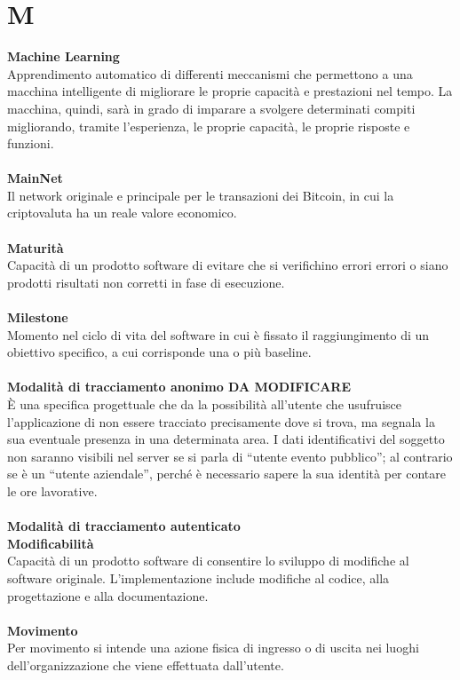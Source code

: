 \section{M}
\textbf{Machine Learning}\\
Apprendimento automatico di differenti meccanismi che permettono a una macchina intelligente di migliorare le proprie capacità e prestazioni nel tempo. La macchina, quindi, sarà in grado di imparare a svolgere determinati compiti migliorando, tramite l’esperienza, le proprie capacità, le proprie risposte e funzioni. \\ \\
\textbf{MainNet}\\
Il network originale e principale per le transazioni dei Bitcoin, in cui la criptovaluta ha un reale valore economico. \\ \\
\textbf{Maturità}\\
Capacità di un prodotto software di evitare che si verifichino errori errori o siano prodotti risultati non corretti in fase di esecuzione. \\ \\
\textbf{Milestone}\\
Momento nel ciclo di vita del software in cui è fissato il raggiungimento di un obiettivo specifico, a cui corrisponde una o più baseline.\\ \\
\textbf{Modalità di tracciamento anonimo DA MODIFICARE}\\
È una specifica progettuale che da la possibilità all’utente che usufruisce l’applicazione di non essere tracciato precisamente dove si trova, ma segnala la sua eventuale presenza in una determinata area. I dati identificativi del soggetto non saranno visibili nel server se si parla di “utente evento pubblico”; al contrario se è un “utente aziendale”, perché è necessario sapere la sua identità per contare le ore lavorative. \\ \\

\textbf{Modalità di tracciamento autenticato}\\
\textbf{Modificabilità}\\
Capacità di un prodotto software di consentire lo sviluppo di modifiche al software originale. L'implementazione include modifiche al codice, alla progettazione e alla documentazione.\\ \\
\textbf{Movimento}\\
Per movimento si intende una azione fisica di ingresso o di uscita nei luoghi dell'organizzazione che viene effettuata dall'utente. \\ \\
\clearpage